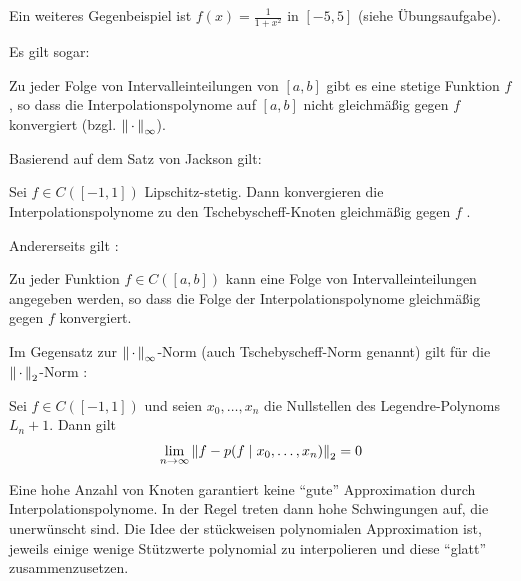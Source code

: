Ein weiteres Gegenbeispiel ist $f(x)=\frac{1}{1+x^2}$ in $[-5,5]$ 
(siehe Übungsaufgabe).

Es gilt sogar:

\begin{Satze}[Faber]
  Zu jeder Folge von Intervalleinteilungen von $[a,b]$
  gibt es eine stetige Funktion $f$ ,
  so dass die Interpolationspolynome auf $[a, b]$
  nicht gleichmäßig gegen $f$ konvergiert 
  (bzgl. $\left\| \,\cdot\, \right\|_\infty$).
\end{Satze}

Basierend auf dem Satz von Jackson gilt:
\begin{Satze}
  Sei $f\in C([-1,1])$ Lipschitz-stetig.
  Dann konvergieren die Interpolationspolynome
  zu den Tschebyscheff-Knoten gleichmäßig	gegen $f$ .
\end{Satze}

Andererseits gilt \cite[siehe][]{haemmerlinhoffmann}:
\begin{Satze}[Marcinkiewicz]
  Zu jeder Funktion $f\in C([a,b])$ kann eine Folge von
  Intervalleinteilungen angegeben werden,
  so dass die Folge der Interpolationspolynome gleichmäßig gegen $f$ konvergiert.
\end{Satze}

Im Gegensatz zur $\left\| \,\cdot\, \right\|_\infty$-Norm (auch Tschebyscheff-Norm genannt)
gilt für die $\left\| \,\cdot\, \right\|_2$-Norm \cite[siehe][]{haemmerlinhoffmann}:
\begin{Satze}
  Sei $f\in C([-1,1])$ und seien $x_0,\dots, x_n$ die Nullstellen
  des	Legendre-Polynoms $L_n+1$. Dann gilt
  \begin{gather*}
    \lim\limits_{n\rightarrow \infty}\left\| f-p(f\mid x_0,\dots, x_n) \right\|_2 = 0
  \end{gather*}
\end{Satze}


Eine hohe Anzahl von Knoten garantiert keine \enquote{gute}
Approximation durch Interpolationspolynome.
In der Regel treten dann hohe Schwingungen auf,
die unerwünscht sind.
Die Idee der stückweisen polynomialen Approximation ist,
jeweils einige wenige Stützwerte polynomial zu interpolieren
und diese \enquote{glatt} zusammenzusetzen.

